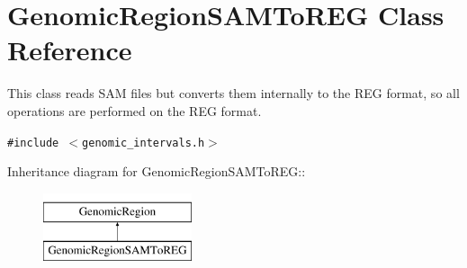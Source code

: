 \hypertarget{classGenomicRegionSAMToREG}{
\section{GenomicRegionSAMToREG Class Reference}
\label{classGenomicRegionSAMToREG}
}
This class reads SAM files but converts them internally to the REG format, so all operations are performed on the REG format.  


{\tt \#include $<$genomic\_\-intervals.h$>$}

Inheritance diagram for GenomicRegionSAMToREG::\begin{figure}[H]
\begin{center}
\leavevmode
\includegraphics[height=2cm]{classGenomicRegionSAMToREG}
\end{center}
\end{figure}
